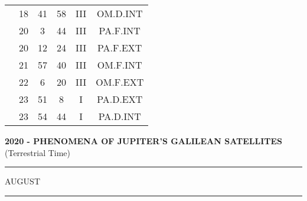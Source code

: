 \documentclass[12pt, a4paper]{article}
\begin{document}
\begin{multicols}{3}
{\begin{tabular}{c c c c c c}
	 	 	 	 & 18 & 41 & 58 & III & OM.D.INT\\%
	 	 	 	 & 20 & 3 & 44 & III & PA.F.INT\\%
	 	 	 	 & 20 & 12 & 24 & III & PA.F.EXT\\%
	 	 	 	 & 21 & 57 & 40 & III & OM.F.INT\\%
	 	 	 	 & 22 & 6 & 20 & III & OM.F.EXT\\%
	 	 	 	 & 23 & 51 & 8 & I & PA.D.EXT\\%
	 	 	 	 & 23 & 54 & 44 & I & PA.D.INT\\%
	 	 \end{tabular}
 	}
\end{multicols}
\textbf{2020 - PHENOMENA OF JUPITER'S GALILEAN SATELLITES}\\(Terrestrial Time) 
\vspace{0.1cm} \hrule \vspace{0.1cm}
AUGUST\vspace{0.1cm}
\hrule
\vspace{-0.2cm}
\end{document}
